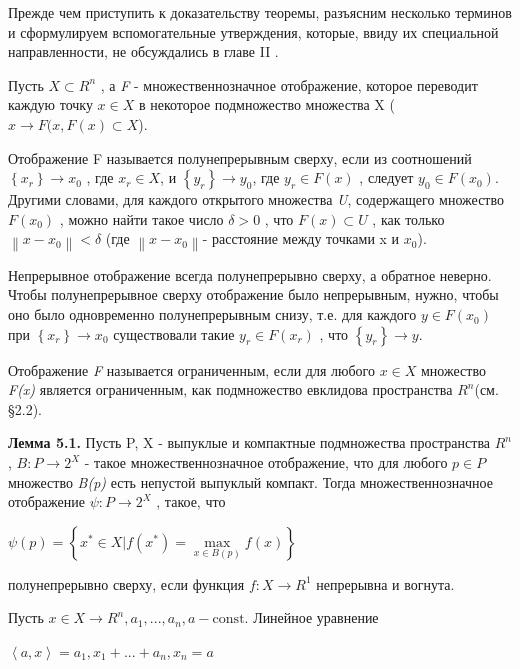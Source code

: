 \documentclass[12pt, 4paper]{book}
\begin{document}
{Прежде чем приступить к доказательству теоремы, разъясним несколько терминов и сформулируем вспомогательные утверждения, которые, ввиду их специальной направленности, не обсуждались в главе II .
\par

Пусть $X \subset R^n$ , а \textit{F} - множественнозначное отображение, которое переводит каждую точку $x \in X$ в некоторое подмножество множества X ($x \rightarrow F(x, F(x) \subset X$).
\par

Отображение F называется полунепрерывным сверху, если из соотношений $\left\{ x_r \right\}\rightarrow x_0$ , где $x_r \in X$, и $\left\{ y_r \right\} \rightarrow y_0$, где $y_r \in F(x)$ , следует $y_0 \in F(x_0)$. Другими словами, для каждого открытого множества \textit{U}, содержащего множество $F(x_0)$ , можно найти такое число $\delta > 0$ , что $F(x) \subset U$ , как только $ \left\| x - x_0 \right\|<\delta$ (где $\left\|x-x_0\right\|$- расстояние между точками x и $x_0$).
\par

Непрерывное отображение всегда полунепрерывно сверху, а обратное неверно. Чтобы полунепрерывное сверху отображение было непрерывным, нужно, чтобы оно было одновременно полунепрерывным снизу, т.е. для каждого $y \in F(x_0)$ при $\left\{ x_r \right\} \rightarrow x_0$ существовали такие $y_r \in F(x_r)$ , что $\left\{ y_r \right\} \rightarrow y$.
\par

Отображение \textit{F} называется ограниченным, если для любого $x \in X$ множество \textit{F(x)} является ограниченным, как подмножество евклидова пространства $R^n$(см. §2.2). 
\par

\textbf{Лемма 5.1.} Пусть P, X - выпуклые и компактные подмножества пространства $R^n$ , $B:P \rightarrow 2^X$ - такое множественнозначное отображение, что для любого $p \in P$ множество \textit{B(p)} есть непустой выпуклый компакт. Тогда множественнозначное отображение $\psi : P \rightarrow 2^X$ , такое, что
\begin{center}
$\psi(p)=\left\{ x^{*} \in X |f(x^{*}) = \max\limits_{x \in B(p)} f(x) \right\}$
\end{center}
полунепрерывно сверху, если функция $f : X \rightarrow R^1$ непрерывна и вогнута.
\par

Пусть $x \in X \rightarrow R^n,a_1,...,a_n,a - \text{const}$. Линейное уравнение 
\begin{center}
$\left\langle  a,x \right\rangle = a_1,x_1 + ... + a_n,x_n = a$
\end{center}
\par

}
\end{document}
